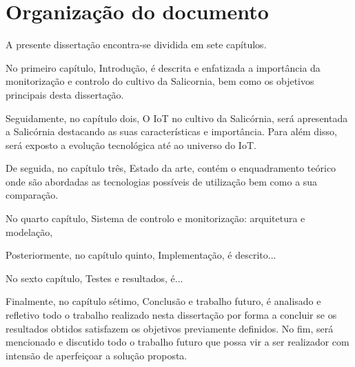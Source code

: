 \section{Organização do documento}


A presente dissertação encontra-se dividida em sete capítulos.
 


No primeiro capítulo, Introdução, é descrita e enfatizada a importância da monitorização e controlo do cultivo da Salicornia, bem como os objetivos principais desta dissertação. 



Seguidamente, no capítulo dois, O \ac{IoT} no cultivo da Salicórnia, será apresentada a Salicórnia destacando as suas características e importância. Para além disso, será  
exposto a evolução tecnológica até ao universo do \ac{IoT}. 



De seguida, no capítulo três, Estado da arte, contém o enquadramento teórico onde são abordadas as tecnologias possíveis de utilização bem como a sua comparação. 



No quarto capítulo, Sistema de controlo e monitorização: arquitetura e modelação, 


Posteriormente, no capítulo quinto, Implementação, é descrito... 



No sexto capítulo, Testes e resultados, é... 


Finalmente, no capítulo sétimo, Conclusão e trabalho futuro, é analisado e refletivo todo o trabalho realizado nesta dissertação por forma a concluir se os resultados obtidos satisfazem os objetivos previamente definidos. No fim, será mencionado e discutido todo o trabalho futuro que possa vir a ser realizador com intensão de aperfeiçoar a solução proposta. 



























